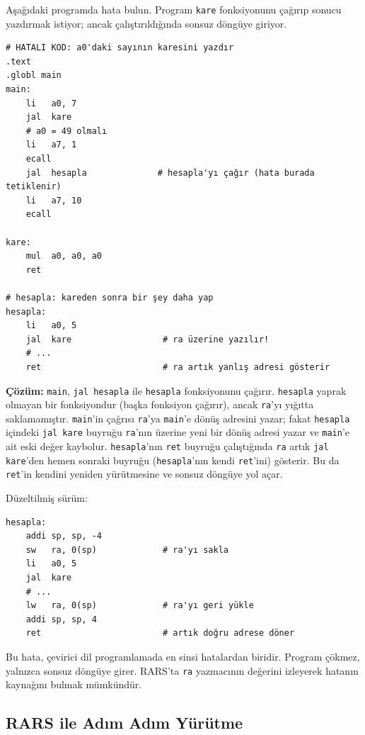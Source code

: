 \begin{ornek}[4.24]
\label{orn:hata-ra}
Aşağıdaki programda hata bulun. Program \texttt{kare} fonksiyonunu çağırıp sonucu yazdırmak istiyor; ancak çalıştırıldığında sonsuz döngüye giriyor.

\begin{lstlisting}[style=riscv]
# HATALI KOD: a0'daki sayının karesini yazdır
.text
.globl main
main:
    li   a0, 7
    jal  kare
    # a0 = 49 olmalı
    li   a7, 1
    ecall
    jal  hesapla              # hesapla'yı çağır (hata burada tetiklenir)
    li   a7, 10
    ecall

kare:
    mul  a0, a0, a0
    ret

# hesapla: kareden sonra bir şey daha yap
hesapla:
    li   a0, 5
    jal  kare                  # ra üzerine yazılır!
    # ...
    ret                        # ra artık yanlış adresi gösterir
\end{lstlisting}

\textbf{Çözüm:} \texttt{main}, \texttt{jal hesapla} ile \texttt{hesapla} fonksiyonunu çağırır. \texttt{hesapla} yaprak olmayan bir fonksiyondur (başka fonksiyon çağırır), ancak \texttt{ra}'yı yığıtta saklamamıştır. \texttt{main}'in çağrısı \texttt{ra}'ya \texttt{main}'e dönüş adresini yazar; fakat \texttt{hesapla} içindeki \texttt{jal kare} buyruğu \texttt{ra}'nın üzerine yeni bir dönüş adresi yazar ve \texttt{main}'e ait eski değer kaybolur. \texttt{hesapla}'nın \texttt{ret} buyruğu çalıştığında \texttt{ra} artık \texttt{jal kare}'den hemen sonraki buyruğu (\texttt{hesapla}'nın kendi \texttt{ret}'ini) gösterir. Bu da \texttt{ret}'in kendini yeniden yürütmesine ve sonsuz döngüye yol açar.

Düzeltilmiş sürüm:

\begin{lstlisting}[style=riscv]
hesapla:
    addi sp, sp, -4
    sw   ra, 0(sp)             # ra'yı sakla
    li   a0, 5
    jal  kare
    # ...
    lw   ra, 0(sp)             # ra'yı geri yükle
    addi sp, sp, 4
    ret                        # artık doğru adrese döner
\end{lstlisting}

Bu hata, çevirici dil programlamada en sinsi hatalardan biridir. Program çökmez, yalnızca sonsuz döngüye girer. RARS'ta \texttt{ra} yazmacının değerini izleyerek hatanın kaynağını bulmak mümkündür.
\end{ornek}

\subsection{RARS ile Adım Adım Yürütme}
\label{subsec:rars-hata-ayiklama}

